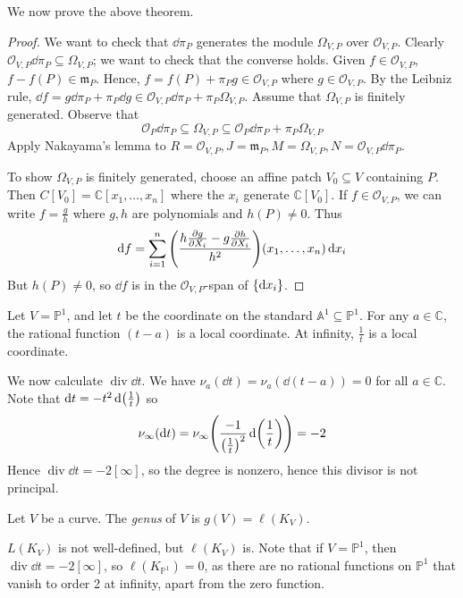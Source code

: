 We now prove the above theorem.
\begin{proof}
    We want to check that \( \dd{\pi_P} \) generates the module \( \Omega_{V,P} \) over \( \mathcal O_{V,P} \).
    Clearly \( \mathcal O_{V,P} \dd{\pi_P} \subseteq \Omega_{V,P} \); we want to check that the converse holds.
    Given \( f \in \mathcal O_{V,P} \), \( f - f(P) \in \mathfrak m_P \).
    Hence, \( f = f(P) + \pi_P g \in \mathcal O_{V,P} \) where \( g \in \mathcal O_{V,P} \).
    By the Leibniz rule, \( \dd{f} = g \dd{\pi_P} + \pi_P \dd{g}  \in \mathcal O_{V,P} \dd{\pi_P} + \pi_P \Omega_{V,P} \).
    Assume that \( \Omega_{V,P} \) is finitely generated.
    Observe that
    \[ \mathcal O_P \dd{\pi_P} \subseteq \Omega_{V,P} \subseteq \mathcal O_P \dd{\pi_P} + \pi_P \Omega_{V,P} \]
    Apply Nakayama's lemma to \( R = \mathcal O_{V,P}, J = \mathfrak m_P, M = \Omega_{V,P}, N = \mathcal O_{V,P} \dd{\pi_P} \).

    To show \( \Omega_{V,P} \) is finitely generated, choose an affine patch \( V_0 \subseteq V \) containing \( P \).
    Then \( C[V_0] = \mathbb C[x_1, \dots, x_n] \) where the \( x_i \) generate \( \mathbb C[V_0] \).
    If \( f \in \mathcal O_{V,P} \), we can write \( f = \frac{g}{h} \) where \( g, h \) are polynomials and \( h(P) \neq 0 \).
    Thus
    \[ \dd{f} = \sum_{i=1}^n \qty(\frac{h\pdv{g}{X_i} - g\pdv{h}{X_i}}{h^2})(x_1, \dots, x_n) \dd{x_i} \]
    But \( h(P) \neq 0 \), so \( \dd{f} \) is in the \( \mathcal O_{V,P} \)-span of \( \qty{\dd{x_i}} \).
\end{proof}
\begin{example}
    Let \( V = \mathbb P^1 \), and let \( t \) be the coordinate on the standard \( \mathbb A^1 \subseteq \mathbb P^1 \).
    For any \( a \in \mathbb C \), the rational function \( (t - a) \) is a local coordinate.
    At infinity, \( \frac{1}{t} \) is a local coordinate.

    We now calculate \( \operatorname{div} \dd{t} \).
    We have \( \nu_a(\dd{t}) = \nu_a(\dd{(t-a)}) = 0 \) for all \( a \in \mathbb C \).
    Note that \( \dd{t} = -t^2 \dd{\qty(\frac{1}{t})} \) so
    \[ \nu_\infty(\dd{t}) = \nu_\infty\qty(\frac{-1}{\qty(\frac{1}{t})^2} \dd{\qty(\frac{1}{t})}) = -2 \]
    Hence \( \operatorname{div} \dd{t} = -2[\infty] \), so the degree is nonzero, hence this divisor is not principal.
\end{example}
\begin{definition}
    Let \( V \) be a curve.
    The \emph{genus} of \( V \) is \( g(V) = \ell(K_V) \).
\end{definition}
\( L(K_V) \) is not well-defined, but \( \ell(K_V) \) is.
Note that if \( V = \mathbb P^1 \), then \( \operatorname{div}\dd{t} = -2[\infty] \), so \( \ell(K_{\mathbb P^1}) = 0 \), as there are no rational functions on \( \mathbb P^1 \) that vanish to order 2 at infinity, apart from the zero function.

